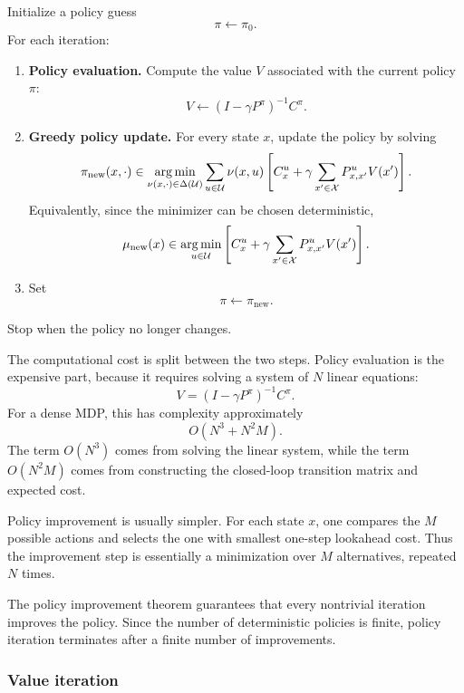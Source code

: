 \begin{theorembox}
Initialize a policy guess
\[
\pi \leftarrow \pi_0.
\]
For each iteration:
\begin{enumerate}
    \item \textbf{Policy evaluation.} Compute the value \(V\) associated with the current policy
    \(\pi\):
    \[
    V
    \leftarrow
    (I-\gamma P^\pi)^{-1}C^\pi.
    \]

    \item \textbf{Greedy policy update.} For every state \(x\), update the policy by solving
    \[
    \pi_{\mathrm{new}}(x,\cdot)
    \in
    \operatorname*{arg\,min}_{\nu(x,\cdot)\in\Delta(\mathcal{U})}
    \sum_{u\in\mathcal{U}}\nu(x,u)
    \left[
    C_x^u
    +
    \gamma\sum_{x'\in\mathcal{X}}P^u_{x,x'}V(x')
    \right].
    \]
    Equivalently, since the minimizer can be chosen deterministic,
    \[
    \mu_{\mathrm{new}}(x)
    \in
    \operatorname*{arg\,min}_{u\in\mathcal{U}}
    \left[
    C_x^u
    +
    \gamma\sum_{x'\in\mathcal{X}}P^u_{x,x'}V(x')
    \right].
    \]

    \item Set
    \[
    \pi \leftarrow \pi_{\mathrm{new}}.
    \]
\end{enumerate}
Stop when the policy no longer changes.
\end{theorembox}

The computational cost is split between the two steps. Policy evaluation is the expensive part,
because it requires solving a system of \(N\) linear equations:
\[
V=(I-\gamma P^\pi)^{-1}C^\pi.
\]
For a dense MDP, this has complexity approximately
\[
O(N^3+N^2M).
\]
The term \(O(N^3)\) comes from solving the linear system, while the term \(O(N^2M)\) comes
from constructing the closed-loop transition matrix and expected cost.

Policy improvement is usually simpler. For each state \(x\), one compares the \(M\) possible
actions and selects the one with smallest one-step lookahead cost. Thus the improvement step is
essentially a minimization over \(M\) alternatives, repeated \(N\) times.

The policy improvement theorem guarantees that every nontrivial iteration improves the policy.
Since the number of deterministic policies is finite, policy iteration terminates after a finite
number of improvements.

\subsubsection{Value iteration}

